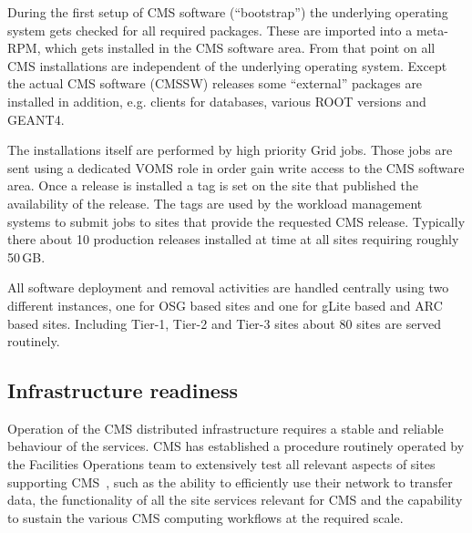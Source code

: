 During the
first setup of CMS software (``bootstrap'') the underlying operating system gets
checked for all required packages. These are imported into a meta-RPM,
which gets installed in the CMS software area. From that point on all
CMS installations are independent of the underlying operating
system. Except the actual CMS software (CMSSW) releases some ``external'' 
packages are installed in addition, e.g. clients for databases, various ROOT
versions and GEANT4.

The installations itself are performed by high priority Grid
jobs. Those jobs are sent using a dedicated VOMS role %
in order gain write access to the CMS software area. Once a release is
installed a tag is set on the %
site that published the availability of
the release. The tags are used by the workload management systems to
submit jobs to sites that provide the requested CMS release.
Typically there about 10 production releases installed at time at all
sites requiring roughly 50\,GB.

All software deployment and  removal activities are handled centrally
using two different instances, one for OSG based sites and one for
gLite based and ARC based sites. Including Tier-1, Tier-2 and Tier-3
sites about 80 sites are served routinely.

\subsection{Infrastructure readiness}
\label{sec:4_2}
Operation of the CMS distributed infrastructure requires a stable and 
reliable behaviour of the services.
CMS has established a procedure routinely operated by the Facilities 
Operations team to extensively test all relevant aspects of sites 
supporting CMS~\cite{RefSite}, such as the ability to efficiently use their 
network to transfer data, the functionality of all the site services relevant 
for CMS and the capability to sustain the various CMS computing workflows at 
the required scale.

